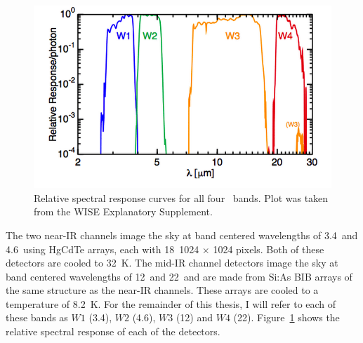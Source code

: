     \begin{figure}
    \centering
    \includegraphics[scale=0.5]{Ch2/wise_response}
    \caption[\WS\ Bands]{Relative spectral response curves for all four \WS\ bands. Plot was taken from the WISE Explanatory Supplement.}
    \label{fig:wise_bands}
    \end{figure}
   
   
   The two near-IR channels image the sky at band centered wavelengths of 3.4\micron\ and 4.6\micron\ using HgCdTe arrays, each with 18\micron\ 1024 $\times$ 1024 pixels. Both of these detectors are cooled to 32~K. The mid-IR channel detectors image the sky at band centered wavelengths of 12\micron\ and 22\micron\ and are made from Si:As BIB arrays of the same structure as the near-IR channels. These arrays are cooled to a temperature of 8.2~K. For the remainder of this thesis, I will refer to each of these bands as $W1$ (3.4\micron), $W2$ (4.6\micron), $W3$ (12\micron) and $W4$ (22\micron). Figure~\ref{fig:wise_bands} shows the relative spectral response of each of the detectors. 
   
    
    
   
